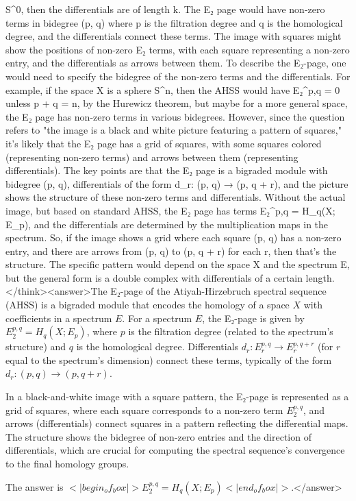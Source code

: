 S^0, then the differentials are of length k. The E₂ page would have non-zero terms in bidegree (p, q) where p is the filtration degree and q is the homological degree, and the differentials connect these terms. The image with squares might show the positions of non-zero E₂ terms, with each square representing a non-zero entry, and the differentials as arrows between them. To describe the E₂-page, one would need to specify the bidegree of the non-zero terms and the differentials. For example, if the space X is a sphere S^n, then the AHSS would have E₂^{p,q} = 0 unless p + q = n, by the Hurewicz theorem, but maybe for a more general space, the E₂ page has non-zero terms in various bidegrees. However, since the question refers to "the image is a black and white picture featuring a pattern of squares," it's likely that the E₂ page has a grid of squares, with some squares colored (representing non-zero terms) and arrows between them (representing differentials). The key points are that the E₂ page is a bigraded module with bidegree (p, q), differentials of the form d_r: (p, q) → (p, q + r), and the picture shows the structure of these non-zero terms and differentials. Without the actual image, but based on standard AHSS, the E₂ page has terms E₂^{p,q} = H_q(X; E_p), and the differentials are determined by the multiplication maps in the spectrum. So, if the image shows a grid where each square (p, q) has a non-zero entry, and there are arrows from (p, q) to (p, q + r) for each r, then that's the structure. The specific pattern would depend on the space X and the spectrum E, but the general form is a double complex with differentials of a certain length.</think><answer>The E₂-page of the Atiyah-Hirzebruch spectral sequence (AHSS) is a bigraded module that encodes the homology of a space \( X \) with coefficients in a spectrum \( E \). For a spectrum \( E \), the E₂-page is given by \( E_2^{p,q} = H_q(X; E_p) \), where \( p \) is the filtration degree (related to the spectrum's structure) and \( q \) is the homological degree. Differentials \( d_r: E_r^{p,q} \to E_r^{p, q+r} \) (for \( r \) equal to the spectrum's dimension) connect these terms, typically of the form \( d_r: (p, q) \to (p, q+r) \).  

In a black-and-white image with a square pattern, the E₂-page is represented as a grid of squares, where each square corresponds to a non-zero term \( E_2^{p,q} \), and arrows (differentials) connect squares in a pattern reflecting the differential maps. The structure shows the bidegree of non-zero entries and the direction of differentials, which are crucial for computing the spectral sequence's convergence to the final homology groups.  

The answer is \(<|begin_of_box|>E_2^{p,q} = H_q(X; E_p)<|end_of_box|>\).</answer>